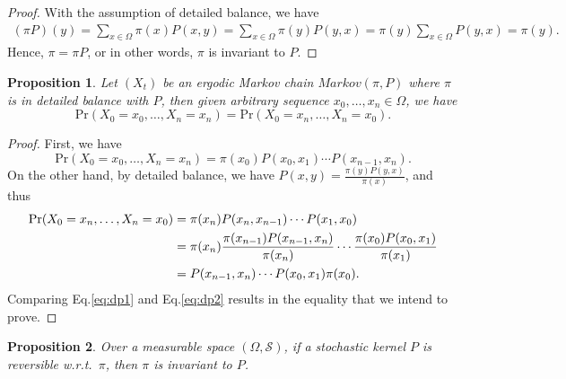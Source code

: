 \documentclass[a4paper,11pt]{article}
\newtheorem{proposition}{Proposition}
\newcommand{\pr}{\mathrm{Pr}}
\newcommand{\sset}{\mathcal{S}}
\begin{document}
\begin{proof}
    With the assumption of detailed balance, we have
    \begin{align}
        (\pi P)(y) = \sum_{x \in \Omega} \pi(x) P(x, y) = \sum_{x \in \Omega} \pi(y) P(y, x) = \pi(y) \sum_{x \in \Omega} P(y, x) = \pi(y).
    \end{align}
    Hence, $\pi = \pi P$, or in other words, $\pi$ is invariant to $P$. 
\end{proof}


\begin{proposition}
    Let $(X_t)$ be an ergodic Markov chain $Markov(\pi, P)$ where $\pi$ is in detailed balance with $P$, then given arbitrary sequence $x_0, \ldots, x_n \in \Omega$, we have
    \begin{equation}
        \pr(X_0 = x_0, \ldots, X_n = x_n) = \pr(X_0 = x_n, \ldots, X_n = x_0).
    \end{equation}
\end{proposition}

\begin{proof}
    First, we have
    \begin{equation} \label{eq:dp1}
        \pr(X_0 = x_0, \ldots, X_n = x_n) = \pi(x_0) P(x_0, x_1) \cdots P(x_{n-1}, x_n).
    \end{equation}
    On the other hand, by detailed balance, we have $P(x, y) = \frac{\pi(y) P(y, x)}{\pi(x)}$, and thus
    \begin{align} \label{eq:dp2}
        \pr(X_0 = x_n, \ldots, X_n = x_0) 
        &= \pi(x_n) P(x_n, x_{n-1}) \cdots P(x_1, x_0) \notag \\
        &= \pi(x_n) \frac{\pi(x_{n-1}) P(x_{n-1}, x_n)}{\pi(x_n)} \cdots \frac{\pi(x_0) P(x_0, x_1)}{\pi(x_1)} \notag \\
        &= P(x_{n-1}, x_n) \cdots P(x_0, x_1) \pi(x_0).
    \end{align}
    Comparing Eq.\eqref{eq:dp1} and Eq.\eqref{eq:dp2} results in the equality that we intend to prove.
\end{proof}


\begin{proposition}
    Over a measurable space $(\Omega, \sset)$, if a stochastic kernel $P$ is reversible \textit{w.r.t.}~$\pi$, then $\pi$ is invariant to $P$.
\end{proposition}
\end{document}
